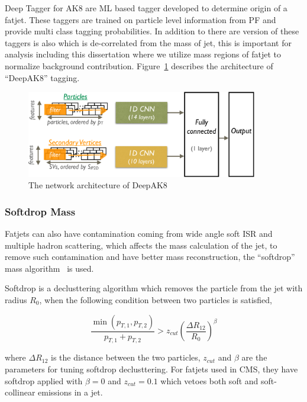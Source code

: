 Deep Tagger for AK8 are \gls{ML} based tagger developed to determine
origin of a fatjet. These taggers are trained on particle level information
from \gls{PF} and provide multi class tagging probabilities. In addition to
there are version of these taggers is also which is de-correlated from the mass of jet,
this is important for analysis including this dissertation where we utilize
mass regions of fatjet to normalize background contribution. Figure~\ref{fig:cms-deepAK8-arch}
describes the architecture of ``DeepAK8'' tagging.

\begin{figure}[!ht]
  \centering
  \includegraphics[width=0.9\textwidth]{figures/CMS_JME_18_002_Figure_009.pdf}
  \caption[The network architecture of DeepAK8]%
  {The network architecture of DeepAK8~\cite{cms-jme-deep-tagger}}%
  \label{fig:cms-deepAK8-arch}
\end{figure}

\subsubsection{
  Softdrop Mass
}

Fatjets can also have contamination coming from wide angle
soft \gls{ISR} and multiple hadron scattering,
which affects the mass calculation of the jet, to remove
such contamination and have better mass reconstruction, the
``softdrop'' mass algorithm~\cite{softdrop-mass-2014} is used.

Softdrop is a declusttering algorithm which removes the particle from the jet
with radius \( R_0 \), when the following condition between two particles is satisfied,

\begin{equation}
  \frac{\min(p_{T,1}, p_{T,2})}{p_{T,1} + p_{T,2}} > z_{cut} {\left( \frac{\Delta R_{12}}{R_0} \right)}^{\beta}
\end{equation}

where \( \Delta R_{12} \) is the distance between the two particles, \( z_{cut} \)
and \( \beta \) are the parameters for tuning softdrop declusttering.
For fatjets used in \gls{CMS}, they have softdrop applied with
\( \beta = 0\) and \( z_{cut} = 0.1\) which vetoes both soft
and soft-collinear emissions in a jet.

